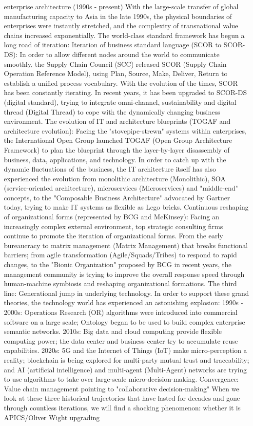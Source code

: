 \documentclass[11pt,a4paper]{article}
\begin{document}
enterprise architecture (1990s - present) With the large-scale transfer of global manufacturing capacity to Asia in the late 1990s, the physical boundaries of enterprises were instantly stretched, and the complexity of transnational value chains increased exponentially. The world-class standard framework has begun a long road of iteration: Iteration of business standard language (SCOR to SCOR-DS): In order to allow different nodes around the world to communicate smoothly, the Supply Chain Council (SCC) released SCOR (Supply Chain Operation Reference Model), using Plan, Source, Make, Deliver, Return to establish a unified process vocabulary. With the evolution of the times, SCOR has been constantly iterating. In recent years, it has been upgraded to SCOR-DS (digital standard), trying to integrate omni-channel, sustainability and digital thread (Digital Thread) to cope with the dynamically changing business environment. The evolution of IT and architecture blueprints (TOGAF and architecture evolution): Facing the "stovepipe-strewn" systems within enterprises, the International Open Group launched TOGAF (Open Group Architecture Framework) to plan the blueprint through the layer-by-layer disassembly of business, data, applications, and technology. In order to catch up with the dynamic fluctuations of the business, the IT architecture itself has also experienced the evolution from monolithic architecture (Monolithic), SOA (service-oriented architecture), microservices (Microservices) and "middle-end" concepts, to the "Composable Business Architecture" advocated by Gartner today, trying to make IT systems as flexible as Lego bricks. Continuous reshaping of organizational forms (represented by BCG and McKinsey): Facing an increasingly complex external environment, top strategic consulting firms continue to promote the iteration of organizational forms. From the early bureaucracy to matrix management (Matrix Management) that breaks functional barriers; from agile transformation (Agile/Squads/Tribes) to respond to rapid changes, to the "Bionic Organization" proposed by BCG in recent years, the management community is trying to improve the overall response speed through human-machine symbiosis and reshaping organizational formations. The third line: Generational jump in underlying technology. In order to support these grand theories, the technology world has experienced an astonishing explosion: 1990s - 2000s: Operations Research (OR) algorithms were introduced into commercial software on a large scale; Ontology began to be used to build complex enterprise semantic networks. 2010s: Big data and cloud computing provide flexible computing power; the data center and business center try to accumulate reuse capabilities. 2020s: 5G and the Internet of Things (IoT) make micro-perception a reality; blockchain is being explored for multi-party mutual trust and traceability; and AI (artificial intelligence) and multi-agent (Multi-Agent) networks are trying to use algorithms to take over large-scale micro-decision-making. Convergence: Value chain management pointing to "collaborative decision-making" When we look at these three historical trajectories that have lasted for decades and gone through countless iterations, we will find a shocking phenomenon: whether it is APICS/Oliver Wight upgrading 
\end{document}

